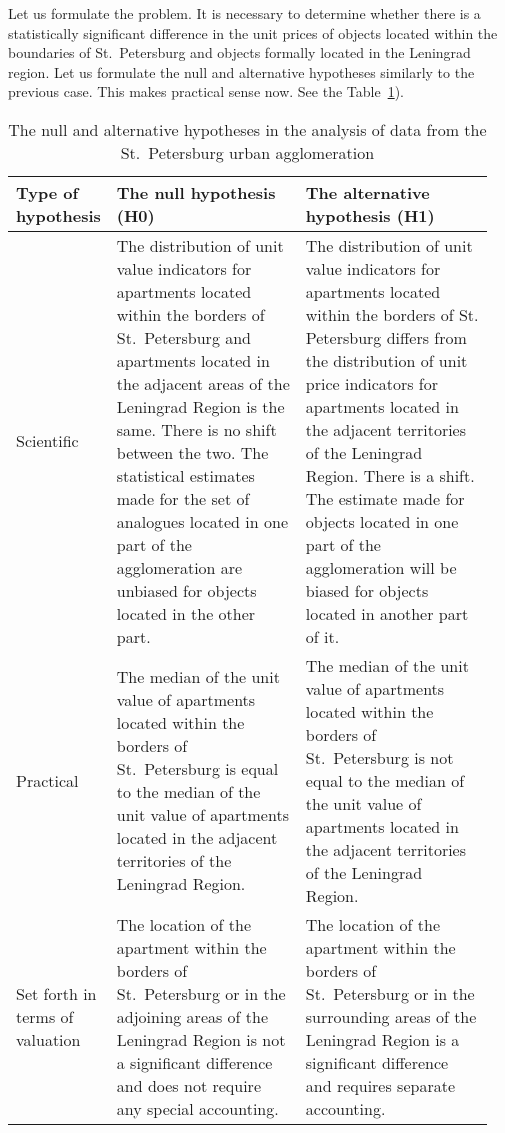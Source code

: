 \documentclass[]{scrreprt}
\begin{document}
Let us formulate the problem. It is necessary to determine whether there is a statistically significant difference in the unit prices of objects located within the boundaries of St.~Petersburg and objects formally located in the Leningrad region. Let us formulate the null and alternative hypotheses similarly to the previous case. This makes practical sense now. See the Table~\ref{tab:nul-alt-hypothesis-SPba}).
\begin{table}[htp]
	\caption{The null and alternative hypotheses in the analysis of data from the St.~Petersburg urban agglomeration}\label{tab:nul-alt-hypothesis-SPba}
	\centering
	\begin{tabularx}{\textwidth}{p{0.15\linewidth} p{0.4\linewidth} p{0.4\linewidth}} 
		\hline
		Type of hypothesis&The null hypothesis (H0)&The alternative hypothesis (H1)\\
		\hline
		Scientific&The distribution of unit value indicators for apartments located within the borders of St.~Petersburg and apartments located in the adjacent areas of the Leningrad Region is the same. There is no shift between the two. The statistical estimates made for the set of analogues located in one part of the agglomeration are unbiased for objects located in the other part.&The distribution of unit value indicators for apartments located within the borders of St. Petersburg differs from the distribution of unit price indicators for apartments located in the adjacent territories of the Leningrad Region. There is a shift. The estimate made for objects located in one part of the agglomeration will be biased for objects located in another part of it.\\
		\hline
		Practical&The median of the unit value of apartments located within the borders of St.~Petersburg is equal to the median of the unit value of apartments located in the adjacent territories of the Leningrad Region.&The median of the unit value of apartments located within the borders of St.~Petersburg is not equal to the median of the unit value of apartments located in the adjacent territories of the Leningrad Region.\\
		\hline
		Set forth in terms of valuation&The location of the apartment within the borders of St.~Petersburg or in the adjoining areas of the Leningrad Region is not a significant difference and does not require any special accounting.&The location of the apartment within the borders of St.~Petersburg or in the surrounding areas of the Leningrad Region is a significant difference and requires separate accounting.\\ \hline
	\end{tabularx}
\end{table}
\end{document}

